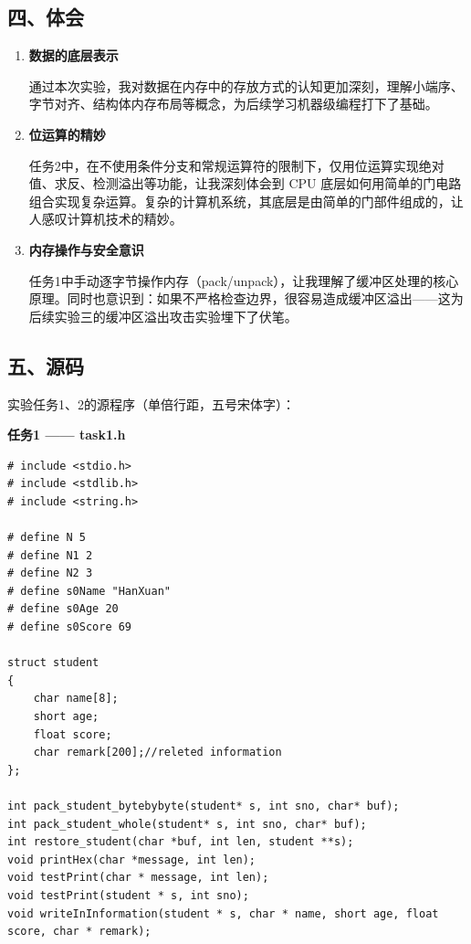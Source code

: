 \subsection*{四、体会}

\begin{enumerate}[label=\arabic*.]
    \item \textbf{数据的底层表示}

    通过本次实验，我对数据在内存中的存放方式的认知更加深刻，理解小端序、字节对齐、结构体内存布局等概念，为后续学习机器级编程打下了基础。

    \item \textbf{位运算的精妙}

    任务2中，在不使用条件分支和常规运算符的限制下，仅用位运算实现绝对值、求反、检测溢出等功能，让我深刻体会到 CPU 底层如何用简单的门电路组合实现复杂运算。复杂的计算机系统，其底层是由简单的门部件组成的，让人感叹计算机技术的精妙。

    \item \textbf{内存操作与安全意识}

    任务1中手动逐字节操作内存（pack/unpack），让我理解了缓冲区处理的核心原理。同时也意识到：如果不严格检查边界，很容易造成缓冲区溢出——这为后续实验三的缓冲区溢出攻击实验埋下了伏笔。
\end{enumerate}

\subsection*{五、源码}

{\songti 实验任务1、2的源程序（单倍行距，五号宋体字）：}

\vspace{0.3cm}
\textbf{任务1 —— task1.h}

\begin{lstlisting}[basicstyle=\ttfamily\zihao{5},lineskip=-1pt]
# include <stdio.h>
# include <stdlib.h>
# include <string.h>

# define N 5
# define N1 2
# define N2 3
# define s0Name "HanXuan"
# define s0Age 20
# define s0Score 69

struct student
{
    char name[8];
    short age;
    float score;
    char remark[200];//releted information
};

int pack_student_bytebybyte(student* s, int sno, char* buf);
int pack_student_whole(student* s, int sno, char* buf);
int restore_student(char *buf, int len, student **s);
void printHex(char *message, int len);
void testPrint(char * message, int len);
void testPrint(student * s, int sno);
void writeInInformation(student * s, char * name, short age, float score, char * remark);
\end{lstlisting}

